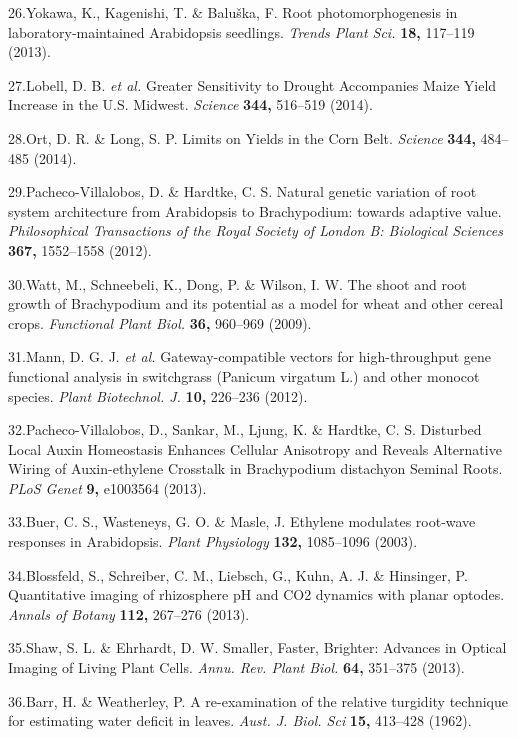 \documentclass[]{article}
\begin{document}
26.Yokawa, K., Kagenishi, T. \& Balu{š}ka, F. Root photomorphogenesis in
laboratory-maintained Arabidopsis seedlings. \emph{Trends Plant Sci.}
\textbf{18,} 117--119 (2013).

27.Lobell, D. B. \emph{et al.} Greater Sensitivity to Drought
Accompanies Maize Yield Increase in the U.S. Midwest. \emph{Science}
\textbf{344,} 516--519 (2014).

28.Ort, D. R. \& Long, S. P. Limits on Yields in the Corn Belt.
\emph{Science} \textbf{344,} 484--485 (2014).

29.Pacheco-Villalobos, D. \& Hardtke, C. S. Natural genetic variation of
root system architecture from Arabidopsis to Brachypodium: towards
adaptive value. \emph{Philosophical Transactions of the Royal Society of
London B: Biological Sciences} \textbf{367,} 1552--1558 (2012).

30.Watt, M., Schneebeli, K., Dong, P. \& Wilson, I. W. The shoot and
root growth of Brachypodium and its potential as a model for wheat and
other cereal crops. \emph{Functional Plant Biol.} \textbf{36,} 960--969
(2009).

31.Mann, D. G. J. \emph{et al.} Gateway-compatible vectors for
high-throughput gene functional analysis in switchgrass (Panicum
virgatum L.) and other monocot species. \emph{Plant Biotechnol. J.}
\textbf{10,} 226--236 (2012).

32.Pacheco-Villalobos, D., Sankar, M., Ljung, K. \& Hardtke, C. S.
Disturbed Local Auxin Homeostasis Enhances Cellular Anisotropy and
Reveals Alternative Wiring of Auxin-ethylene Crosstalk in Brachypodium
distachyon Seminal Roots. \emph{PLoS Genet} \textbf{9,} e1003564 (2013).

33.Buer, C. S., Wasteneys, G. O. \& Masle, J. Ethylene modulates
root-wave responses in Arabidopsis. \emph{Plant Physiology}
\textbf{132,} 1085--1096 (2003).

34.Blossfeld, S., Schreiber, C. M., Liebsch, G., Kuhn, A. J. \&
Hinsinger, P. Quantitative imaging of rhizosphere pH and CO2 dynamics
with planar optodes. \emph{Annals of Botany} \textbf{112,} 267--276
(2013).

35.Shaw, S. L. \& Ehrhardt, D. W. Smaller, Faster, Brighter: Advances in
Optical Imaging of Living Plant Cells. \emph{Annu. Rev. Plant Biol.}
\textbf{64,} 351--375 (2013).

36.Barr, H. \& Weatherley, P. A re-examination of the relative turgidity
technique for estimating water deficit in leaves. \emph{Aust. J. Biol.
Sci} \textbf{15,} 413--428 (1962).
\end{document}
